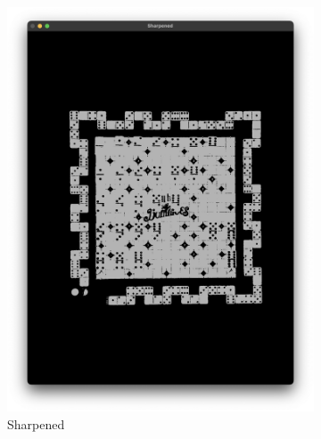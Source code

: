 \documentclass[12pt]{article}
\begin{document}
    \begin{figure}[!h]
        \ContinuedFloat
        \centering
        \begin{subfigure}{.5\textwidth}
            \centering
            \includegraphics[width=0.9\linewidth]{images/board_extraction/sharpened.png}
            \caption{Sharpened}
            \label{fig:be-sharpened}
        \end{subfigure}%
        \begin{subfigure}{.5\textwidth}
            \centering

\end{subfigure}
\end{figure}
\end{document}
